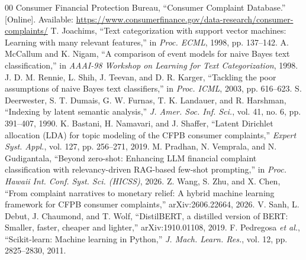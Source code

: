 \documentclass[conference]{IEEEtran}
\begin{document}
\begin{thebibliography}{00}
 Consumer Financial Protection Bureau, ``Consumer Complaint Database.'' [Online]. Available: \url{https://www.consumerfinance.gov/data-research/consumer-complaints/}
 T. Joachims, ``Text categorization with support vector machines: Learning with many relevant features,'' in \textit{Proc. ECML}, 1998, pp. 137--142.
 A. McCallum and K. Nigam, ``A comparison of event models for naive Bayes text classification,'' in \textit{AAAI-98 Workshop on Learning for Text Categorization}, 1998.
 J. D. M. Rennie, L. Shih, J. Teevan, and D. R. Karger, ``Tackling the poor assumptions of naive Bayes text classifiers,'' in \textit{Proc. ICML}, 2003, pp. 616--623.
 S. Deerwester, S. T. Dumais, G. W. Furnas, T. K. Landauer, and R. Harshman, ``Indexing by latent semantic analysis,'' \textit{J. Amer. Soc. Inf. Sci.}, vol. 41, no. 6, pp. 391--407, 1990.
 K. Bastani, H. Namavari, and J. Shaffer, ``Latent Dirichlet allocation (LDA) for topic modeling of the CFPB consumer complaints,'' \textit{Expert Syst. Appl.}, vol. 127, pp. 256--271, 2019.
 M. Pradhan, N. Vemprala, and N. Gudigantala, ``Beyond zero-shot: Enhancing LLM financial complaint classification with relevancy-driven RAG-based few-shot prompting,'' in \textit{Proc. Hawaii Int. Conf. Syst. Sci. (HICSS)}, 2026.
 Z. Wang, S. Zhu, and X. Chen, ``From complaint narratives to monetary relief: A hybrid machine learning framework for CFPB consumer complaints,'' arXiv:2606.22664, 2026.
 V. Sanh, L. Debut, J. Chaumond, and T. Wolf, ``DistilBERT, a distilled version of BERT: Smaller, faster, cheaper and lighter,'' arXiv:1910.01108, 2019.
 F. Pedregosa \textit{et al.}, ``Scikit-learn: Machine learning in Python,'' \textit{J. Mach. Learn. Res.}, vol. 12, pp. 2825--2830, 2011.
\end{thebibliography}
\end{document}
